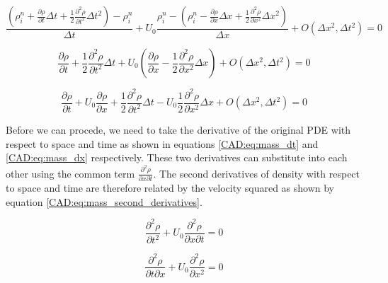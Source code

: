 \documentclass{mc2015}
\begin{document}
    \begin{equation}
    	\label{CAD:eq:MEA_start}
    	\frac{ \left( \rho_{i}^{n} + \frac{\partial \rho}{\partial t} \Delta t +
    	\frac{1}{2} \frac{\partial^2 \rho}{\partial t^2} \Delta t^2 \right)-\rho_{i}^{n} }{\Delta t} 
    	+ U_{0} \frac{\rho_{i}^{n} - \left( \rho_{i}^{n} -  \frac{\partial \rho}{\partial x} \Delta x + 
    	\frac{1}{2} \frac{\partial^2 \rho}{\partial x^2} \Delta x^2 \right)}{\Delta x} 
    	+ O(\Delta x^{2},\Delta t^{2}) 
    	= 0
    \end{equation}
    
    \begin{equation}
    	\label{CAD:eq:MEA_p0}
    	 \frac{\partial \rho}{\partial t}  + \frac{1}{2} \frac{\partial^2 \rho}{\partial t^2} \Delta t +
    	 U_{0} \left(   \frac{\partial \rho}{\partial x}  - \frac{1}{2} \frac{\partial^2 \rho}{\partial x^2} \Delta x \right) 
    	 + O(\Delta x^{2},\Delta t^{2}) 
    	 = 0
    \end{equation}
    
    \begin{equation}
    	\label{CAD:eq:MEA_p1}
    	 \frac{\partial \rho}{\partial t}  +  U_{0} \frac{\partial \rho}{\partial x} + 
    	 \frac{1}{2} \frac{\partial^2 \rho}{\partial t^2} \Delta t -
    	   U_{0}  \frac{1}{2} \frac{\partial^2 \rho}{\partial x^2} \Delta x  
    	   + O(\Delta x^{2},\Delta t^{2}) = 0 
    \end{equation} \linebreak
    
    Before we can procede, we need to take the derivative of the original PDE with respect
    to space and time as shown in equations \ref{CAD:eq:mass_dt} and  \ref{CAD:eq:mass_dx} 
    respectively. These two derivatives can substitute into each other using the common 
    term $\frac{\partial^2 \rho}{\partial x \partial t}$. The second derivatives of density with 
    respect to space and time are therefore related by the velocity squared as
    shown by equation \ref{CAD:eq:mass_second_derivatives}.
    
    \begin{equation}
    \label{CAD:eq:mass_dt}
    	 \frac{\partial^2 \rho}{\partial t^2} + U_{0} \frac{\partial^2 \rho}{\partial x \partial t} = 0
    \end{equation}
    
    \begin{equation}
    \label{CAD:eq:mass_dx}
    	 \frac{\partial^2 \rho}{\partial t \partial x} + U_{0} \frac{\partial^2 \rho}{\partial x^2} = 0
    \end{equation}
    
\end{document}
